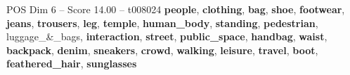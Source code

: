 \begin{textsample}{POS Dim 6 – Score 14.00 – t008024}  \label{ex:f6_pos_007}
\textbf{people}, \textbf{clothing}, \textbf{bag}, \textbf{shoe}, \textbf{footwear}, \textbf{jeans}, \textbf{trousers}, \textbf{leg}, \textbf{temple}, \textbf{human\_body}, \textbf{standing}, \textbf{pedestrian}, luggage\_\&\_bags, \textbf{interaction}, \textbf{street}, \textbf{public\_space}, \textbf{handbag}, \textbf{waist}, \textbf{backpack}, \textbf{denim}, \textbf{sneakers}, \textbf{crowd}, \textbf{walking}, \textbf{leisure}, \textbf{travel}, \textbf{boot}, \textbf{feathered\_hair}, \textbf{sunglasses}

\end{textsample}
